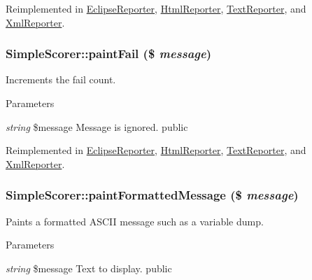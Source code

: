 Reimplemented in \hyperlink{class_eclipse_reporter_aebbe55b20bc08df87eb01823113dd7f1}{EclipseReporter}, \hyperlink{class_html_reporter_a13348c829f8853d8ad061b6b6112f5b8}{HtmlReporter}, \hyperlink{class_text_reporter_a277a5065cf8be1cd0ea7880d7e599d51}{TextReporter}, and \hyperlink{class_xml_reporter_a5525741fbc22b229dbc37de38df815cf}{XmlReporter}.\hypertarget{class_simple_scorer_a25656682bd645cf156f3a2a87893d8b3}{
\subsubsection[{paintFail}]{\setlength{\rightskip}{0pt plus 5cm}SimpleScorer::paintFail (\$ {\em message})}}
\label{class_simple_scorer_a25656682bd645cf156f3a2a87893d8b3}
Increments the fail count. 
\begin{DoxyParams}{Parameters}
\item[{\em string}]\$message Message is ignored.  public \end{DoxyParams}


Reimplemented in \hyperlink{class_eclipse_reporter_a0b040a0e5cb9d9ac50a33e9df8a7cc57}{EclipseReporter}, \hyperlink{class_html_reporter_a5e19e29324ad91541a15586032744136}{HtmlReporter}, \hyperlink{class_text_reporter_a2163ad5700b27e62efe530849664db5d}{TextReporter}, and \hyperlink{class_xml_reporter_afc04e91cbe663a1d38103392c9672b6f}{XmlReporter}.\hypertarget{class_simple_scorer_a19d5b72bd448cc22636569e20b64f607}{
\subsubsection[{paintFormattedMessage}]{\setlength{\rightskip}{0pt plus 5cm}SimpleScorer::paintFormattedMessage (\$ {\em message})}}
\label{class_simple_scorer_a19d5b72bd448cc22636569e20b64f607}
Paints a formatted ASCII message such as a variable dump. 
\begin{DoxyParams}{Parameters}
\item[{\em string}]\$message Text to display.  public \end{DoxyParams}



